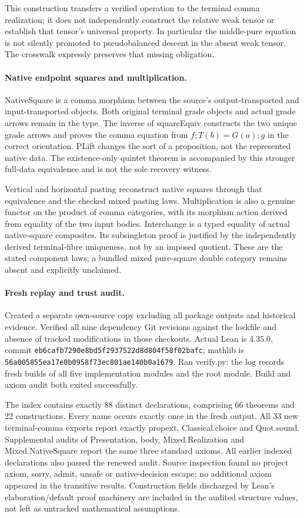 \documentclass{article}
\begin{document}
This construction transfers a verified operation to the terminal comma realization; it does not independently construct the relative weak tensor or establish that tensor's universal property. In particular the middle-pure equation is not silently promoted to pseudobalanced descent in the absent weak tensor. The crosswalk expressly preserves that missing obligation.

\paragraph{Native endpoint squares and multiplication.}
NativeSquare is a comma morphism between the source's output-transported and input-transported objects. Both original terminal grade objects and actual grade arrows remain in the type. The inverse of squareEquiv constructs the two unique grade arrows and proves the comma equation from $f;T(b)=G(a);g$ in the correct orientation. PLift changes the sort of a proposition, not the represented native data. The existence-only quintet theorem is accompanied by this stronger full-data equivalence and is not the sole recovery witness.

Vertical and horizontal pasting reconstruct native squares through that equivalence and the checked mixed pasting laws. Multiplication is also a genuine functor on the product of comma categories, with its morphism action derived from equality of the two input bodies. Interchange is a typed equality of actual native-square composites. Its subsingleton proof is justified by the independently derived terminal-fibre uniqueness, not by an imposed quotient. These are the stated component laws; a bundled mixed pure-square double category remains absent and explicitly unclaimed.

\paragraph{Fresh replay and trust audit.}
Created a separate own-source copy excluding all package outputs and historical evidence. Verified all nine dependency Git revisions against the lockfile and absence of tracked modifications in those checkouts. Actual Lean is 4.35.0, commit \texttt{eb6cafb7290e8bd5f2937522d8d804f58f02bafc}; mathlib is \texttt{56a005855ea17e0b0958f73ec801ae140b0a1679}. Ran verify.py: the log records fresh builds of all five implementation modules and the root module. Build and axiom audit both exited successfully.

The index contains exactly 88 distinct declarations, comprising 66 theorems and 22 constructions. Every name occurs exactly once in the fresh output. All 33 new terminal-comma exports report exactly propext, Classical.choice and Quot.sound. Supplemental audits of Presentation, body, Mixed.Realization and Mixed.NativeSquare report the same three standard axioms. All earlier indexed declarations also passed the renewed audit. Source inspection found no project axiom, sorry, admit, unsafe or native-decision escape; no additional axiom appeared in the transitive results. Construction fields discharged by Lean's elaboration/default proof machinery are included in the audited structure values, not left as untracked mathematical assumptions.
\end{document}
